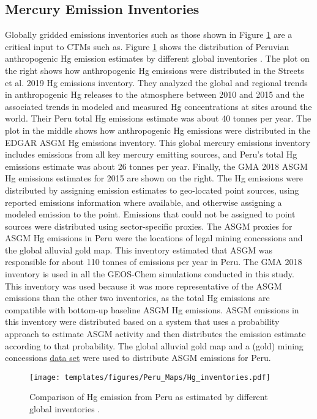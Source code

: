 \subsection{Mercury Emission Inventories}
\begin{flushleft}


Globally gridded emissions inventories such as those shown in Figure \ref{fig:Hg_inventories} are a critical input to CTMs such as\gc. Figure \ref{fig:Hg_inventories} shows the distribution of Peruvian anthropogenic Hg emission estimates by different global inventories \cite{united_nations_environment_programme_technical_2019,steenhuisen_development_2019,muntean_evaluating_2018,streets_global_2019}. The plot on the right shows how anthropogenic Hg emissions were distributed in the  Streets et al. 2019 Hg emissions inventory\cite{streets_global_2019}. They analyzed the global and regional trends in anthropogenic Hg releases to the atmosphere between 2010 and 2015 and the associated trends in modeled and measured Hg concentrations at sites around the world. Their Peru total Hg emissions estimate was about 40 tonnes per year. The plot in the middle shows how anthropogenic Hg emissions were distributed in the EDGAR ASGM Hg emissions inventory\cite{muntean_evaluating_2018}. This global mercury emissions inventory includes emissions from all key mercury emitting sources, and Peru's total Hg emissions estimate was about 26 tonnes per year. Finally, the GMA 2018 ASGM Hg emissions estimates for 2015 are shown on the right. The Hg emissions were distributed by assigning emission estimates to geo-located point sources, using reported emissions information where available, and otherwise assigning a modeled emission to the point. Emissions that could not be assigned to point sources were distributed using sector-specific proxies. The ASGM proxies for ASGM Hg emissions in Peru were the locations of legal mining concessions and the global alluvial gold map. This inventory estimated that ASGM was responsible for about 110 tonnes of emissions per year in Peru. The GMA 2018 inventory is used in all the GEOS-Chem simulations conducted in this study. This inventory was used because it was more representative of the ASGM emissions than the other two inventories, as the total Hg emissions are compatible with bottom-up baseline ASGM Hg emissions. ASGM emissions in this inventory were distributed based on a system that uses a probability approach to estimate ASGM activity and then distributes the emission estimate according to that probability\cite{steenhuisen_development_2019}. The global alluvial gold map and a (gold) mining concessions  \href{(https://data.globalforestwatch.org/search?collection=Dataset&q=mining)}{data set} were used to distribute ASGM emissions for Peru. 
\end{flushleft}
\begin{figure}[H]
  \texttt{[image: templates/figures/Peru\_Maps/Hg\_inventories.pdf]}
  \centering
  \caption{Comparison of Hg emission from Peru as estimated by different global inventories \cite{united_nations_environment_programme_technical_2019,steenhuisen_development_2019,muntean_evaluating_2018,streets_global_2019}.}
  \label{fig:Hg_inventories}
\end{figure}
\FloatBarrier


